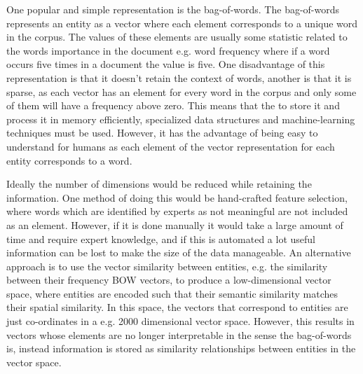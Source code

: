 One popular and simple representation is the bag-of-words. The bag-of-words  represents an entity as a vector where each element corresponds to a unique word in the corpus. The values of these elements are usually some statistic related to the words importance in the document e.g. word frequency where if a word occurs five times in a document the value is five. One disadvantage of this representation is that it doesn't retain the context of words, another is that it is sparse, as each vector has an element for every word in the corpus and only some of them will have a frequency above zero. This means that the to store it and process it in memory efficiently, specialized data structures and machine-learning techniques must be used. However, it has the advantage of being easy to understand for humans as each element of the vector representation for each entity corresponds to a word. 

Ideally the number of dimensions would be reduced while retaining the information. One method of doing this would be hand-crafted feature selection, where words which are identified by experts as not meaningful are not included as an element. However, if it is done manually it would take a large amount of time and require expert knowledge, and  if this is automated a lot useful information can be lost to make the size of the data manageable. An alternative approach is to use the vector similarity between entities, e.g. the similarity between their frequency BOW vectors, to produce a low-dimensional vector space, where entities are encoded  such that their semantic similarity matches their spatial similarity.  In this space, the vectors that correspond to entities are just co-ordinates in a e.g. 2000 dimensional vector space. However, this results in vectors whose elements are no longer interpretable in the sense the bag-of-words is, instead information is stored as similarity relationships between entities in the vector space.





